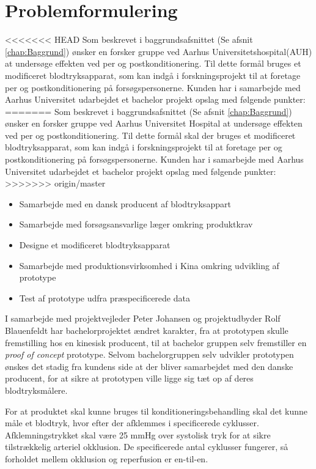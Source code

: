 \chapter{Problemformulering}\label{title:problemformulering}
<<<<<<< HEAD
Som beskrevet i baggrundsafsnittet (Se afsnit \ref{chap:Baggrund}) ønsker en forsker gruppe ved Aarhus Universitetshospital(AUH) at undersøge effekten ved per og postkonditionering. Til dette formål bruges et modificeret blodtryksapparat, som kan indgå i forskningsprojekt til at foretage per og postkonditionering på forsøgspersonerne. Kunden har i samarbejde med Aarhus Universitet udarbejdet et bachelor projekt opslag med følgende punkter:
=======
Som beskrevet i baggrundsafsnittet (Se afsnit \ref{chap:Baggrund}) ønsker en forsker gruppe ved Aarhus Universitet Hospital at undersøge effekten ved per og postkonditionering. Til dette formål skal der bruges et modificeret blodtryksapparat, som kan indgå i forskningsprojekt til at foretage per og postkonditionering på forsøgspersonerne. Kunden har i samarbejde med Aarhus Universitet udarbejdet et bachelor projekt opslag med følgende punkter:
>>>>>>> origin/master
\begin{itemize}
	\item Samarbejde med en dansk producent af blodtryksappart
	\item Samarbejde med forsøgsansvarlige læger omkring produktkrav
	\item Designe et modificeret blodtryksapparat
	\item Samarbejde med produktionsvirksomhed i Kina omkring udvikling af prototype 
	\item Test af prototype udfra præspecificerede data
\end{itemize}

I samarbejde med projektvejleder Peter Johansen og projektudbyder Rolf Blauenfeldt har bachelorprojektet ændret karakter, fra at prototypen skulle fremstilling hos en kinesisk producent, til at bachelor gruppen selv fremstiller en \textit{proof of concept} prototype. Selvom bachelorgruppen selv udvikler prototypen ønskes det stadig fra kundens side at der bliver samarbejdet med den danske producent, for at sikre at prototypen ville ligge sig tæt op af deres blodtryksmålere.

For at produktet skal kunne bruges til konditioneringsbehandling skal det kunne måle et blodtryk, hvor efter der afklemmes i specificerede cyklusser. Afklemningstrykket skal være 25 mmHg over systolisk tryk for at sikre tilstrækkelig arteriel okklusion. De specificerede antal cyklusser fungerer, så forholdet mellem okklusion og reperfusion er en-til-en. 

